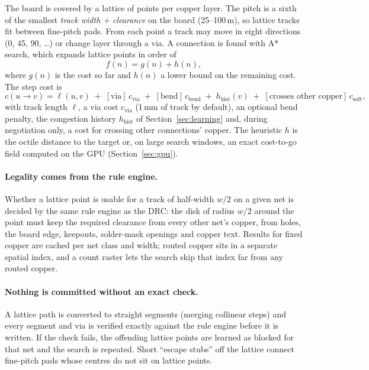 \documentclass[10pt,a4paper]{article}
\begin{document}
The board is covered by a lattice of points per copper layer. The pitch is a sixth of the smallest
\emph{track width + clearance} on the board (25--100\,\textmu m), so lattice tracks fit between fine-pitch pads.
From each point a track may move in eight directions (0\textdegree, 45\textdegree, 90\textdegree, \ldots) or
change layer through a via. A connection is found with A* search, which expands lattice points in order of
\begin{equation}
  f(n) = g(n) + h(n),
\end{equation}
where $g(n)$ is the cost so far and $h(n)$ a lower bound on the remaining cost. The step cost is
\begin{equation}
  c(u\to v) = \ell(u,v) \;+\; [\text{via}]\,c_\text{via} \;+\; [\text{bend}]\,c_\text{bend}
  \;+\; h_\text{hist}(v) \;+\; [\text{crosses other copper}]\,c_\text{soft},
\end{equation}
with track length $\ell$, a via cost $c_\text{via}$ (1\,mm of track by default), an optional bend penalty,
the congestion history $h_\text{hist}$ of Section~\ref{sec:learning} and, during negotiation only, a cost for
crossing other connections' copper. The heuristic $h$ is the octile distance to the target or, on large search
windows, an exact cost-to-go field computed on the GPU (Section~\ref{sec:gpu}).

\paragraph{Legality comes from the rule engine.} Whether a lattice point is usable for a track of half-width $w/2$
on a given net is decided by the same rule engine as the DRC: the disk of radius $w/2$ around the point must keep
the required clearance from every other net's copper, from holes, the board edge, keepouts, solder-mask
openings and copper text. Results for fixed copper are cached per net class and width; routed copper sits in a
separate spatial index, and a count raster lets the search skip that index far from any routed copper.

\paragraph{Nothing is committed without an exact check.} A lattice path is converted to straight segments
(merging collinear steps) and every segment and via is verified exactly against the rule engine before it is
written. If the check fails, the offending lattice points are learned as blocked for that net and the search is
repeated. Short ``escape stubs'' off the lattice connect fine-pitch pads whose centres do not sit on lattice
points.
\end{document}
